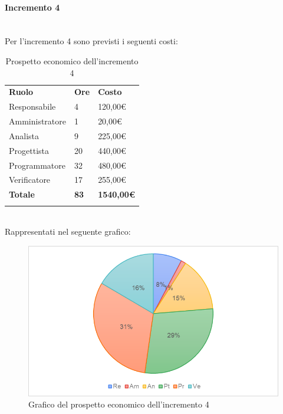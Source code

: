 \paragraph{Incremento 4} \mbox{} \\
Per l'incremento 4 sono previsti i seguenti costi:
\begin{longtable} {
		>{}p{32mm}
		>{}p{20mm}
		>{}p{20mm}
	}
	\rowcolor{gray!50}
	
	\textbf{Ruolo} & \textbf{Ore} & \textbf{Costo} \TBstrut \\
	Responsabile & 4 & 120,00\euro{} \TBstrut \\
	Amministratore & 1 & 20,00\euro{} \TBstrut \\
	Analista & 9 & 225,00\euro{} \TBstrut \\
	Progettista & 20 & 440,00\euro{}\TBstrut \\
	Programmatore & 32 & 480,00\euro{} \TBstrut \\
	Verificatore & 17 & 255,00\euro{} \TBstrut \\
	\textbf{Totale} & \textbf{83}& \textbf{1540,00\euro{}} \TBstrut \\	
	\rowcolor{white}
	\caption{Prospetto economico dell'incremento 4}
\end{longtable} \mbox{} \\
Rappresentati nel seguente grafico: \mbox{}
\begin{figure} [H]
	\includegraphics[width=\linewidth]{./img/Grafici/24.png}
	\caption{Grafico del prospetto economico dell'incremento 4}
\end{figure}
